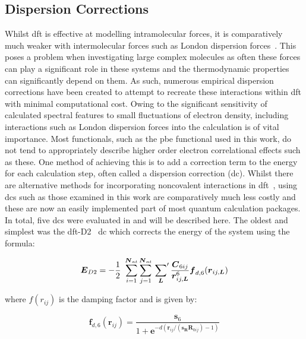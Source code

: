 \subsection{Dispersion Corrections}
\label{subsec:dcs}
Whilst \acrshort{dft} is effective at modelling intramolecular forces, it is comparatively much weaker with intermolecular forces such as London dispersion forces~\cite{Kristyan2004}. This poses a problem when investigating large complex molecules as often these forces can play a significant role in these systems and the thermodynamic properties can significantly depend on them. As such, numerous empirical dispersion corrections have been created to attempt to recreate these interactions within \acrshort{dft} with minimal computational cost. Owing to the significant sensitivity of calculated spectral features to small fluctuations of electron density, including interactions such as London dispersion forces into the calculation is of vital importance. Most functionals, such as the \acrshort{pbe} functional used in this work, do not tend to appropriately describe higher order electron correlational effects such as these. One method of achieving this is to add a correction term to the energy for each calculation step, often called a dispersion correction (\acrshort{dc}). Whilst there are alternative methods for incorporating noncovalent interactions in \acrshort{dft}~\cite{Kozuch2010}, using \acrshort{dc}s such as those examined in this work are comparatively much less costly and these are now an easily implemented part of most quantum calculation packages.
In total, five \acrshort{dc}s were evaluated in  and will be described here. The oldest and simplest was the \acrshort{dft}-D2~\cite{Grimme2006} \acrshort{dc} which corrects the energy of the system using the formula:

\begin{equation}
\boldsymbol{E}_{D2} = -\frac{1}{2}\ \sum_{i=1}^{\boldsymbol{N}_{at}} \sum_{j=1}^{\boldsymbol{N}_{at}} \sideset{}{'}\sum_{\boldsymbol{L}} \frac{\boldsymbol{C}_{6ij}}{\boldsymbol{r}_{ij,\boldsymbol{L}}^6} \boldsymbol{f}_{d,6}(\boldsymbol{r}_{ij, \boldsymbol{L}}) 
\end{equation}

where \( f(r_{ij}) \) is the damping factor and is given by:

\begin{equation}
\boldsymbol{f}_{d,6}(\boldsymbol{r}_{ij}) = \frac{\boldsymbol{s}_6}{1 + \boldsymbol{e}^{-d(\boldsymbol{r}_{ij} / (\boldsymbol{s}_{\boldsymbol{R}} \boldsymbol{R}_{0ij})-1)}} 
\end{equation}


